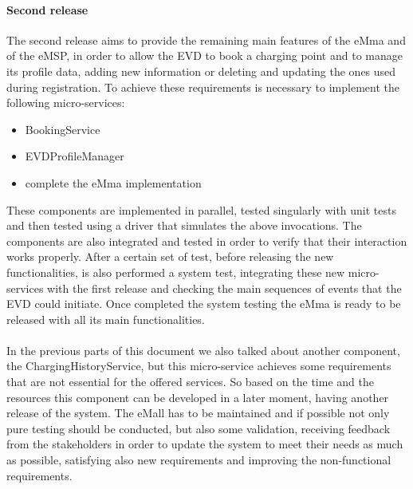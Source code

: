 \paragraph{Second release}
The second release aims to provide the remaining main features of the eMma and of the eMSP, in order to allow the EVD to book a charging point and to manage its profile data, adding new information or deleting and updating the ones used during registration. To achieve these requirements is necessary to implement the following micro-services: 
\begin{itemize}
    \item BookingService
    \item EVDProfileManager
    \item complete the eMma implementation
\end{itemize}
These components are implemented in parallel, tested singularly with unit tests and then tested using a driver that simulates the above invocations. The components are also integrated and tested in order to verify that their interaction works properly. After a certain set of test, before releasing the new functionalities, is also performed a system test, integrating these new micro-services with the first release and checking the main sequences of events that the EVD could initiate. Once completed the system testing the eMma is ready to be released with all its main functionalities.\\\\
In the previous parts of this document we also talked about another component, the ChargingHistoryService, but this micro-service achieves some requirements that are not essential for the offered services. So based on the time and the resources this component can be developed in a later moment, having another release of the system. The eMall has to be maintained and if possible not only pure testing should be conducted, but also some validation, receiving feedback from the stakeholders in order to update the system to meet their needs as much as possible, satisfying also new requirements and improving the non-functional requirements.